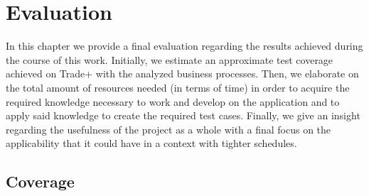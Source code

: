 \chapter{Evaluation}

In this chapter we provide a final evaluation regarding the results achieved during the course of this work. Initially, we estimate an approximate test coverage achieved on Trade+ with the analyzed business processes. Then, we elaborate on the total amount of resources needed (in terms of time) in order to acquire the required knowledge necessary to work and develop on the application and to apply said knowledge to create the required test cases. Finally, we give an insight regarding the usefulness of the project as a whole with a final focus on the applicability that it could have in a context with tighter schedules.

\section{Coverage} 

